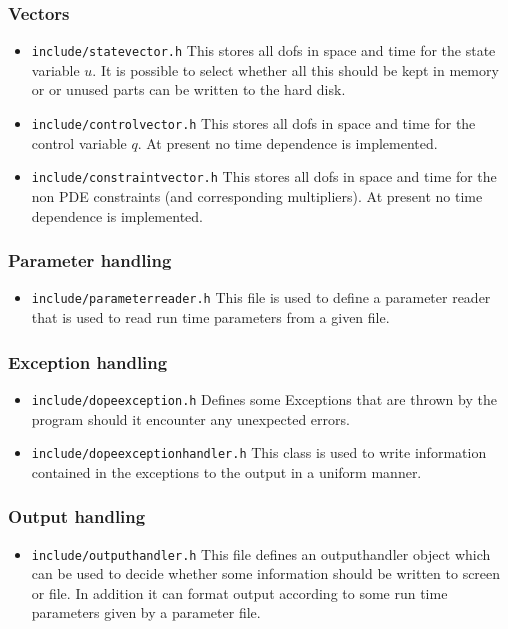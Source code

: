 \documentclass[prodmode,acmtoms]{acmsmall}
\numberwithin{equation}{section}
\begin{document}
\subsubsection{Vectors}
\begin{itemize}
\item \texttt{include/statevector.h} This stores all dofs in space and time for the state 
  variable $u$. It is possible to select whether all this should be kept in memory or 
  or unused parts can be written to the hard disk.
\item \texttt{include/controlvector.h} This stores all dofs in space and time for the 
  control variable $q$. At present no time dependence is implemented.
\item \texttt{include/constraintvector.h} This stores all dofs in space and time for the 
  non PDE constraints (and corresponding multipliers). 
  At present no time dependence is implemented.
\end{itemize}

\subsubsection{Parameter handling}
\begin{itemize}
\item \texttt{include/parameterreader.h} This file is used to define a parameter reader
  that is used to read run time parameters from a given file.
\end{itemize}

\subsubsection{Exception handling}
\begin{itemize}
\item \texttt{include/dopeexception.h} Defines some Exceptions that are thrown by the program
  should it encounter any unexpected errors.
\item \texttt{include/dopeexceptionhandler.h} This class is used to write information 
  contained in the exceptions to the output in a uniform manner.
\end{itemize}

\subsubsection{Output handling}
\begin{itemize}
\item \texttt{include/outputhandler.h} This file defines an outputhandler object which 
  can be used to decide whether some information should be written to screen or file.
  In addition it can format output according to some run time parameters given by a 
  parameter file.
\end{itemize}
\end{document}
